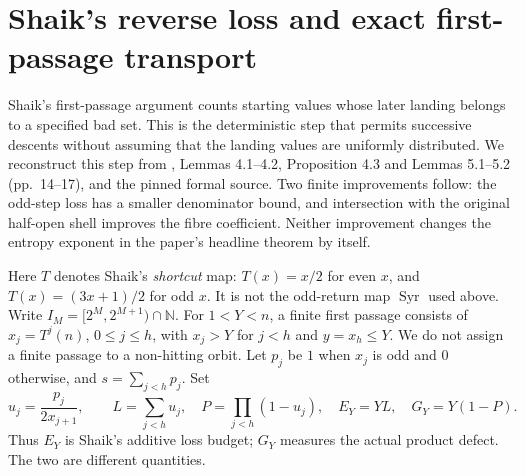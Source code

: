 \documentclass[11pt]{article}
\theoremstyle{remark}\newtheorem{remark}[proposition]{Remark}
\newcommand{\NN}{\mathbb N}
\newcommand{\Syr}{\operatorname{Syr}}
\begin{document}
\section{Shaik's reverse loss and exact first-passage transport}
\label{sec:shaik-reverse}
Shaik's first-passage argument counts starting values whose later landing
belongs to a specified bad set. This is the deterministic step that permits
successive descents without assuming that the landing values are uniformly
distributed. We reconstruct this step from \cite{Shaik2026v324},
Lemmas 4.1--4.2, Proposition 4.3 and Lemmas 5.1--5.2
(pp.~14--17), and the pinned formal source. Two finite improvements follow:
the odd-step loss has a smaller denominator bound, and intersection with
the original half-open shell improves the fibre coefficient.
Neither improvement changes the entropy exponent in the paper's
headline theorem by itself.

Here \(T\) denotes Shaik's \emph{shortcut} map:
\(T(x)=x/2\) for even \(x\), and \(T(x)=(3x+1)/2\) for odd \(x\).
It is not the odd-return map \(\Syr\) used above.
Write \(I_M=[2^M,2^{M+1})\cap\NN\).
For \(1<Y<n\), a finite first passage consists of
\(x_j=T^j(n)\), \(0\le j\le h\), with \(x_j>Y\) for \(j<h\)
and \(y=x_h\le Y\). We do not assign a finite passage to a non-hitting
orbit. Let \(p_j\) be \(1\) when \(x_j\) is odd and \(0\) otherwise,
and \(s=\sum_{j<h}p_j\). Set
\[
 u_j=\frac{p_j}{2x_{j+1}},\qquad
 L=\sum_{j<h}u_j,\quad P=\prod_{j<h}(1-u_j),\quad
 E_Y=YL,\quad G_Y=Y(1-P).
\]
Thus \(E_Y\) is Shaik's additive loss budget; \(G_Y\) measures the
actual product defect. The two are different quantities.
\end{document}
